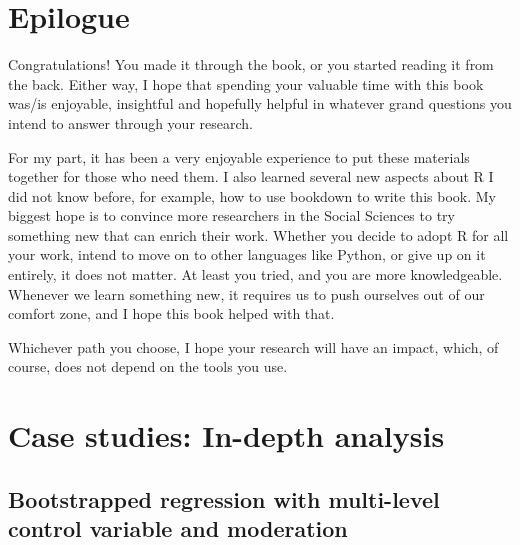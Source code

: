 \documentclass[
]{book}
\begin{document}
\hypertarget{epilogue}{%
\chapter*{Epilogue}\label{epilogue}}

Congratulations! You made it through the book, or you started reading it from the back. Either way, I hope that spending your valuable time with this book was/is enjoyable, insightful and hopefully helpful in whatever grand questions you intend to answer through your research.

For my part, it has been a very enjoyable experience to put these materials together for those who need them. I also learned several new aspects about R I did not know before, for example, how to use bookdown to write this book. My biggest hope is to convince more researchers in the Social Sciences to try something new that can enrich their work. Whether you decide to adopt R for all your work, intend to move on to other languages like Python, or give up on it entirely, it does not matter. At least you tried, and you are more knowledgeable. Whenever we learn something new, it requires us to push ourselves out of our comfort zone, and I hope this book helped with that.

Whichever path you choose, I hope your research will have an impact, which, of course, does not depend on the tools you use.

\hypertarget{case-studies-in-depth-analysis-1}{%
\chapter{Case studies: In-depth analysis}\label{case-studies-in-depth-analysis-1}}

\hypertarget{bootstrapped-regression}{%
\section{Bootstrapped regression with multi-level control variable and moderation}\label{bootstrapped-regression}}
\end{document}
